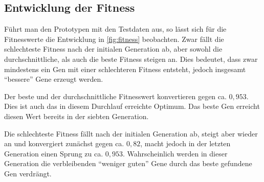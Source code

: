 
\subsection{Entwicklung der Fitness}

Führt man den Prototypen mit den Testdaten aus,
 so lässt sich für die Fitnesswerte die Entwicklung in \autoref{fig:fitness} beobachten.
Zwar fällt die schlechteste Fitness nach der initialen Generation ab,
aber sowohl die durchschnittliche, als auch die beste Fitness steigen an.
Dies bedeutet, dass zwar mindestens ein Gen mit einer schlechteren Fitness entsteht,
jedoch insgesamt \enquote{bessere} Gene erzeugt werden.

Der beste und der durchschnittliche Fitnesswert konvertieren gegen ca. $0,953$.
Dies ist auch das in diesem Durchlauf erreichte Optimum.
Das beste Gen erreicht diesen Wert bereits in der siebten Generation.

Die schlechteste Fitness fällt nach der initialen Generation ab,
steigt aber wieder an und konvergiert zunächst gegen ca. $0,82$,
macht jedoch in der letzten Generation einen Sprung zu ca. $0,953$.
Wahrscheinlich werden in dieser Generation die verbleibenden \enquote{weniger guten} Gene durch das beste gefundene Gen verdrängt.

